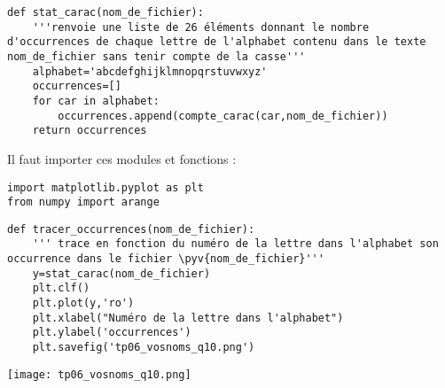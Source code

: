 \question{}

\begin{lstlisting}
def stat_carac(nom_de_fichier):
    '''renvoie une liste de 26 éléments donnant le nombre d'occurrences de chaque lettre de l'alphabet contenu dans le texte nom_de_fichier sans tenir compte de la casse'''
    alphabet='abcdefghijklmnopqrstuvwxyz'
    occurrences=[]
    for car in alphabet:
        occurrences.append(compte_carac(car,nom_de_fichier))
    return occurrences
\end{lstlisting}


\question{}

Il faut importer ces modules et fonctions : 
\begin{lstlisting}
import matplotlib.pyplot as plt
from numpy import arange
\end{lstlisting}

\begin{minipage}{0.5\textwidth}

\begin{lstlisting}
def tracer_occurrences(nom_de_fichier):
    ''' trace en fonction du numéro de la lettre dans l'alphabet son occurrence dans le fichier \pyv{nom_de_fichier}'''
    y=stat_carac(nom_de_fichier)
    plt.clf()
    plt.plot(y,'ro')
    plt.xlabel("Numéro de la lettre dans l'alphabet")
    plt.ylabel('occurrences')
    plt.savefig('tp06_vosnoms_q10.png')
\end{lstlisting}

\end{minipage}
\begin{minipage}{0.5\textwidth}
\begin{center}
\texttt{[image: tp06\_vosnoms\_q10.png]}
\end{center}
\end{minipage}


%
%
%

